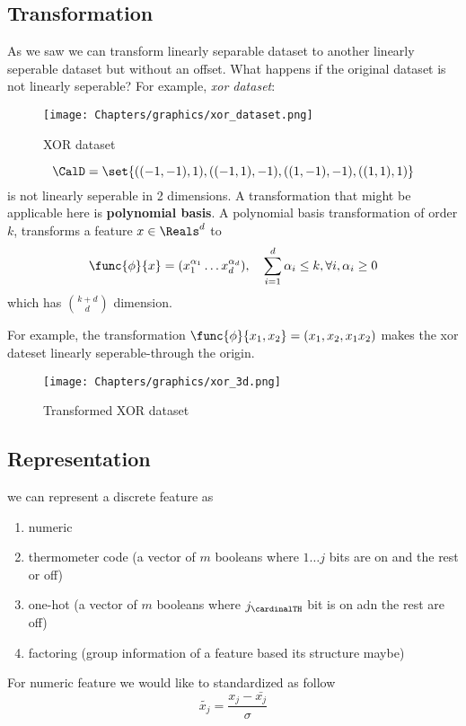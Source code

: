 \subsection{Transformation}
As we saw we can transform linearly separable dataset to another linearly seperable dataset but without an offset. What happens if the original dataset is not linearly seperable? For example, \textit{xor dataset}:
\begin{figure*}[!ht]
    \centering
    \texttt{[image: Chapters/graphics/xor\_dataset.png]}
    \caption{XOR dataset}
\end{figure*}

\begin{equation*}
    \CalD = \set{((-1,-1),1), ((-1,1), -1) , ((1,-1),-1) , ((1,1),1)}
\end{equation*}
is not linearly seperable in 2 dimensions. A transformation that might be applicable here is \textbf{polynomial basis}. A polynomial basis transformation of order \(k\), transforms a feature \(x \in \Reals^d\) to
\begin{equation*}
    \func{\phi}{x} = ( x_1^{\alpha_1} \dots x_d^{\alpha_d}) , \quad \sum_{i = 1}^d \alpha_i \leq k , \forall i, \alpha_i \geq 0
\end{equation*}
which has \(\binom{k + d }{d }\) dimension.

For example, the transformation \(\func{\phi}{x_1, x_2} = (x_1,x_2,x_1x_2)\) makes the xor dateset linearly seperable-through the origin.
\begin{figure*}[!ht]
    \centering
    \texttt{[image: Chapters/graphics/xor\_3d.png]}
    \caption{Transformed XOR dataset}
\end{figure*}
\subsection{Representation}
we can represent a discrete feature as
\begin{enumerate}
    \item numeric
    \item thermometer code (a vector of \(m\) booleans where \(1\dots j\) bits are on and the rest or off)
    \item one-hot (a vector of \(m\) booleans where \(j_{\cardinalTH}\) bit is on adn the rest are off)
    \item factoring (group information of a feature based its structure maybe)
\end{enumerate}

For numeric feature we would like to standardized as follow
\begin{equation*}
    \tilde{x_j}  = \dfrac{x_j - \bar{x_j}}{\sigma}
\end{equation*}